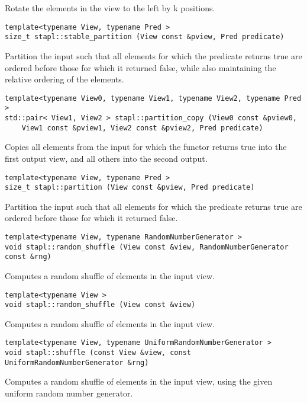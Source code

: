 Rotate the elements in the view to the left by k positions.

\begin{verbatim}
template<typename View, typename Pred >
size_t stapl::stable_partition (View const &pview, Pred predicate)
\end{verbatim}

Partition the input such that all elements for which the predicate returns true are ordered before those for which it returned false, while also maintaining the relative ordering of the elements.

\begin{verbatim}
template<typename View0, typename View1, typename View2, typename Pred >
std::pair< View1, View2 > stapl::partition_copy (View0 const &pview0,
    View1 const &pview1, View2 const &pview2, Pred predicate)
\end{verbatim}

Copies all elements from the input for which the functor returns true into the first output view, and all others into the second output.

\begin{verbatim}
template<typename View, typename Pred >
size_t stapl::partition (View const &pview, Pred predicate)
\end{verbatim}

Partition the input such that all elements for which the predicate returns true are ordered before those for which it returned false.

\begin{verbatim}
template<typename View, typename RandomNumberGenerator >
void stapl::random_shuffle (View const &view, RandomNumberGenerator const &rng)
\end{verbatim}

Computes a random shuffle of elements in the input view.

\begin{verbatim}
template<typename View >
void stapl::random_shuffle (View const &view)
\end{verbatim}

Computes a random shuffle of elements in the input view.

\begin{verbatim}
template<typename View, typename UniformRandomNumberGenerator >
void stapl::shuffle (const View &view, const UniformRandomNumberGenerator &rng)
\end{verbatim}

Computes a random shuffle of elements in the input view, using the given uniform random number generator.

